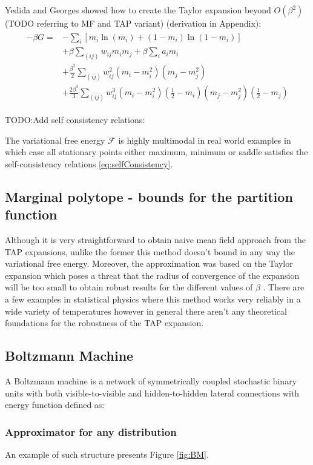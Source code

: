 \documentclass[../report/report.tex]{subfiles}
\begin{document}
 Yedida and Georges showed how to create the Taylor expansion beyond $O(\beta^2)$ (TODO referring to MF and TAP variant) (derivation in Appendix):
\begin{align*}
\begin{split}
-\beta G = & - \sum_i \left[m_i\ln (m_i) +  (1 - m_i)\ln \left( 1-m_i \right)\right]  \\
& + \beta \sum_{(ij)} w_{ij} m_i m_j + \beta \sum_i a_i m_i\\
& + \frac{\beta^2}{2} \sum_{(ij)} w_{ij}^2 (m_i - m_i^2)(m_j-m_j^2)\\
& + \frac{2\beta^3}{3} \sum_{(ij)} w_{ij}^3 (m_i - m_i^2)(\frac{1}{2} - m_i)(m_j - m_j^2)(\frac{1}{2} - m_j)
\label{eq:EMFexpansion}
\end{split}
\end{align*}

TODO:Add self consistency relations:

The variational free energy $\mathcal{F}$ is highly multimodal in real world examples in which case all stationary points either maximum, minimum or saddle satisfies the self-consistency relations \ref{eq:selfConsistency}.


\subsection{Marginal polytope - bounds for the partition function}
Although it is very straightforward to obtain naive mean field approach from the TAP expansions, unlike the former this method doesn't bound in any way the variational free energy. Moreover, the approximation was based on the Taylor expansion which poses a threat that the radius of convergence of the expansion will be too small to obtain robust results for the different values of $\beta$ \cite{yedidia2001idiosyncratic}.
There are a few examples in statistical physics where this method works very reliably in a wide variety of temperatures  \cite{plefka1982convergence} however in general there aren't any theoretical foundations for the robustness of the TAP expansion.


\subsection{Boltzmann Machine}
A Boltzmann machine is a network of symmetrically coupled stochastic binary units with both visible-to-visible and hidden-to-hidden lateral connections with energy function defined as:
 \cite{ackley1985learning}
\subsubsection{Approximator for any distribution}
An example of such structure presents Figure \ref{fig:BM}.
\end{document}
